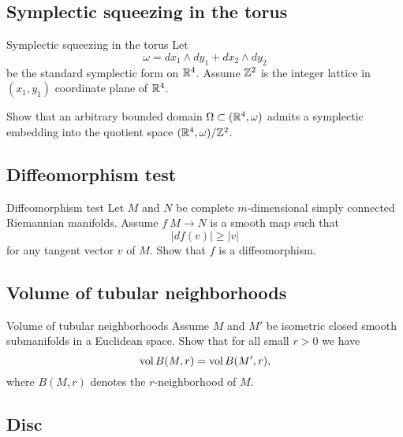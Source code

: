 \subsection*{Symplectic squeezing in the torus}




\begin{pr}{}{Symplectic squeezing in the torus}\label{Symplectic squeezing in the torus}
Let 
\[\omega=dx_1\wedge dy_1+ dx_2\wedge dy_2\]
be the standard symplectic form on $\mathbb{R}^4$.
Assume $\mathbb{Z}^2$ is the integer lattice in $(x_1,y_1)$ coordinate plane of $\mathbb{R}^4$.

Show that an arbitrary bounded domain $\Omega\subset (\mathbb{R}^4,\omega)$
admits a symplectic embedding into the quotient space $(\mathbb{R}^4,\omega)/\mathbb{Z}^2$. 
\end{pr}

\subsection*{Diffeomorphism test\easy}



\begin{pr}{\easy}{Diffeomorphism test}\label{Diffeomorphism test}
Let $M$ and $N$ be 
complete 
$m$-dimensional
simply connected 
Riemannian manifolds.
Assume $f\:M\to N$
is a smooth map such that 
$$|df(v)|\ge |v|$$
for any tangent vector $v$ of $M$.
Show that $f$ is a diffeomorphism.
\end{pr}

\subsection*{Volume of tubular neighborhoods}

\begin{pr}{}{Volume of tubular neighborhoods}\label{Volume of tubular neighborhoods}
Assume $M$ and $M'$ be isometric closed smooth submanifolds in a Euclidean space.
Show that for all small $r>0$ we have
$$\operatorname{\rm vol} B(M,r)=\operatorname{\rm vol} B(M',r),$$
where $B(M,r)$ denotes the $r$-neighborhood of $M$.
\end{pr}

\subsection*{Disc\hard}

